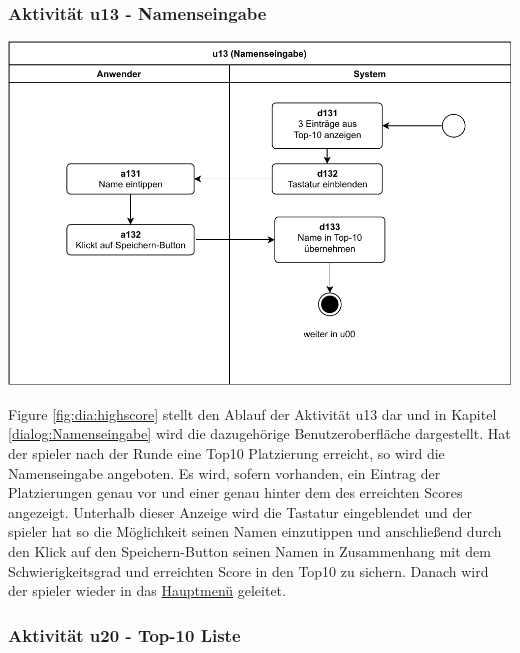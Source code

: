 \clearpage

\subsubsection{Aktivität u13 - Namenseingabe}

\vspace*{1cm}

\includegraphics[width=\linewidth]{diagramme/pdf/UML-Activity-u13.pdf}
\label{fig:dia:highscore}
\vspace*{0.5cm}

Figure \ref{fig:dia:highscore} stellt den Ablauf der Aktivität u13 dar und in Kapitel \ref{dialog:Namenseingabe} wird die dazugehörige Benutzeroberfläche dargestellt.
Hat der \gls{spieler} nach der Runde eine \gls{Top10} Platzierung erreicht, so wird die Namenseingabe angeboten. Es wird, sofern vorhanden, ein Eintrag der Platzierungen genau vor und einer genau hinter dem des erreichten Scores angezeigt. Unterhalb dieser Anzeige wird die Tastatur
eingeblendet und der \gls{spieler} hat so die Möglichkeit seinen Namen einzutippen und anschließend durch den Klick auf den Speichern-Button seinen Namen in Zusammenhang mit dem Schwierigkeitsgrad und erreichten Score in den \gls{Top10} zu sichern. Danach wird der \gls{spieler} wieder in das \hyperref[fig:dia:mainMenu]{Hauptmenü} geleitet.

\clearpage

\subsubsection{Aktivität u20 - Top-10 Liste}


